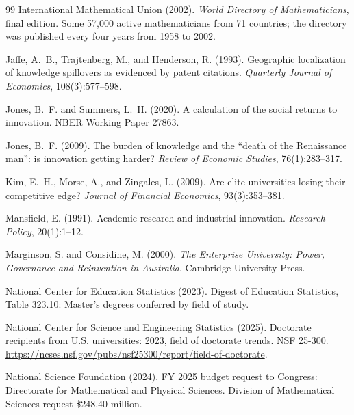 \documentclass[11pt]{article}
\theoremstyle{definition}
\theoremstyle{remark}
\begin{document}
\begin{thebibliography}{99}
International Mathematical Union (2002).
\newblock \emph{World Directory of Mathematicians}, final edition.
\newblock Some 57{,}000 active mathematicians from 71 countries; the directory was published every four years from 1958 to 2002.

Jaffe, A.~B., Trajtenberg, M., and Henderson, R. (1993).
\newblock Geographic localization of knowledge spillovers as evidenced by patent citations.
\newblock \emph{Quarterly Journal of Economics}, 108(3):577--598.

Jones, B.~F. and Summers, L.~H. (2020).
\newblock A calculation of the social returns to innovation.
\newblock NBER Working Paper 27863.

Jones, B.~F. (2009).
\newblock The burden of knowledge and the ``death of the Renaissance man'': is innovation getting harder?
\newblock \emph{Review of Economic Studies}, 76(1):283--317.

Kim, E.~H., Morse, A., and Zingales, L. (2009).
\newblock Are elite universities losing their competitive edge?
\newblock \emph{Journal of Financial Economics}, 93(3):353--381.

Mansfield, E. (1991).
\newblock Academic research and industrial innovation.
\newblock \emph{Research Policy}, 20(1):1--12.

Marginson, S. and Considine, M. (2000).
\newblock \emph{The Enterprise University: Power, Governance and Reinvention in Australia}.
\newblock Cambridge University Press.

National Center for Education Statistics (2023).
\newblock Digest of Education Statistics, Table 323.10: Master's degrees conferred by field of study.

National Center for Science and Engineering Statistics (2025).
\newblock Doctorate recipients from U.S. universities: 2023, field of doctorate trends.
\newblock NSF 25-300. \url{https://ncses.nsf.gov/pubs/nsf25300/report/field-of-doctorate}.

National Science Foundation (2024).
\newblock FY 2025 budget request to Congress: Directorate for Mathematical and Physical Sciences.
\newblock Division of Mathematical Sciences request \$248.40 million.


\end{thebibliography}
\end{document}
